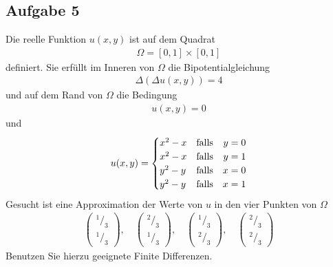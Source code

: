 \documentclass[
	final,
	a4paper,
	oneside,
	parskip=full,
	headings=standardclasses,
	headings=big,
	pointednumbers
]{scrartcl}
\begin{document}
    \subsection*{Aufgabe 5}
    Die reelle Funktion $u{\left(x,  y\right)}$ ist auf dem Quadrat
    \begin{align*}
        \Omega = \left[ 0, 1 \right] \times \left[ 0, 1 \right]
    \end{align*}
    definiert. Sie erfüllt im Inneren von $\Omega$ die Bipotentialgleichung
    \begin{align*}
        \Delta{\left( \Delta u{\left(x,  y\right)} \right)} = 4
    \end{align*}
    und auf dem Rand von $\Omega$ die Bedingung
    \begin{align*}
        u{\left(x,  y\right)} = 0
    \end{align*}
    und
    \begin{align*}
        u{\left(x,  y\right)} =
        \setlength{\arraycolsep}{0pt}
        \renewcommand{\arraystretch}{1.2}
        \left\{
            \begin{array}{l @{\quad} l r l}
                x^2-x & \text{falls\quad} & y &{}= 0 \\
                x^2-x & \text{falls\quad} & y &{}= 1 \\
                y^2-y & \text{falls\quad} & x &{}= 0 \\
                y^2-y & \text{falls\quad} & x &{}= 1
            \end{array}
        \right.
    \end{align*}
    Gesucht ist eine Approximation der Werte von $u$ in den vier Punkten von $\Omega$
    \begin{align*}
        \begin{pmatrix}
            {^1/_3} \\ {^1/_3}
        \end{pmatrix},\quad
        \begin{pmatrix}
            {^2/_3} \\ {^1/_3}
        \end{pmatrix},\quad
        \begin{pmatrix}
            {^1/_3} \\ {^2/_3}
        \end{pmatrix},\quad
        \begin{pmatrix}
            {^2/_3} \\ {^2/_3}
        \end{pmatrix}
    \end{align*}
    Benutzen Sie hierzu geeignete Finite Differenzen.
\end{document}
